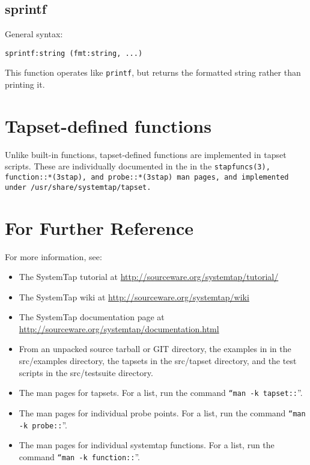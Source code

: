 \documentclass[twoside,english]{article}
\newenvironment{vindent}
{\begin{list}{}{\setlength{\listparindent}{6pt}}
\item[]}
{\end{list}}
\begin{document}
\subsection{sprintf}
General syntax:

\begin{vindent}
\begin{verbatim}
sprintf:string (fmt:string, ...)
\end{verbatim}
\end{vindent}
This function operates like \texttt{printf}, but returns the formatted string
rather than printing it.

\section{Tapset-defined functions\label{sec:Predefined-Functions}}

Unlike built-in functions, tapset-defined functions are implemented in tapset scripts.
These are individually documented in the in the \tt{stapfuncs(3)}, \tt{function::*(3stap)},
and \tt{probe::*(3stap)} man pages, and implemented under \tt{/usr/share/systemtap/tapset}.

\section{For Further Reference\label{sec:For-Further-Reference}}

For more information, see:
\begin{itemize}
\item The SystemTap tutorial at \url{http://sourceware.org/systemtap/tutorial/}
\item The SystemTap wiki at \url{http://sourceware.org/systemtap/wiki}
\item The SystemTap documentation page at \url{http://sourceware.org/systemtap/documentation.html}
\item From an unpacked source tarball or GIT directory, the examples in in the
src/examples directory, the tapsets in the src/tapset directory, and the
test scripts in the src/testsuite directory.
\item The man pages for tapsets.
For a list, run the command \texttt{{}``man -k tapset::}''.
\item The man pages for individual probe points.
For a list, run the command \texttt{{}``man -k probe::}''.
\item The man pages for individual systemtap functions.
For a list, run the command \texttt{{}``man -k function::}''.
\end {itemize}

\setcounter{secnumdepth}{0}
\newpage{}
\printindex{}
\end{document}
